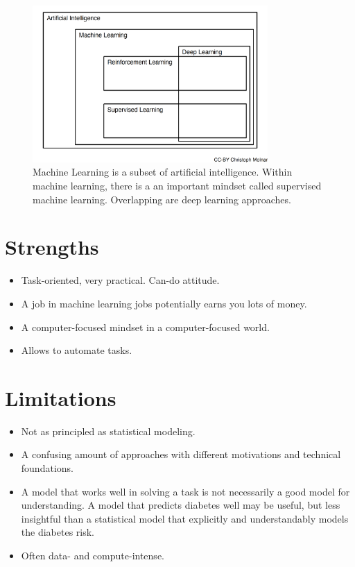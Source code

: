\documentclass[
  10pt,
]{scrbook}
\providecommand{\tightlist}{%
  \setlength{\itemsep}{0pt}\setlength{\parskip}{0pt}}
\begin{document}
\begin{figure}

{\centering \includegraphics[width=0.8\textwidth]{figures/ml-venn-1} 

}

\caption{Machine Learning is a subset of artificial intelligence. Within machine learning, there is a an important mindset called supervised machine learning. Overlapping are deep learning approaches.}\label{fig:ml-venn}
\end{figure}

\hypertarget{strengths-4}{%
\section{Strengths}\label{strengths-4}}

\begin{itemize}
\tightlist
\item
  Task-oriented, very practical. Can-do attitude.
\item
  A job in machine learning jobs potentially earns you lots of money.
\item
  A computer-focused mindset in a computer-focused world.
\item
  Allows to automate tasks.
\end{itemize}

\hypertarget{limitations-4}{%
\section{Limitations}\label{limitations-4}}

\begin{itemize}
\tightlist
\item
  Not as principled as statistical modeling.
\item
  A confusing amount of approaches with different motivations and technical foundations.
\item
  A model that works well in solving a task is not necessarily a good model for understanding. A model that predicts diabetes well may be useful, but less insightful than a statistical model that explicitly and understandably models the diabetes risk.
\item
  Often data- and compute-intense.
\end{itemize}
\end{document}
